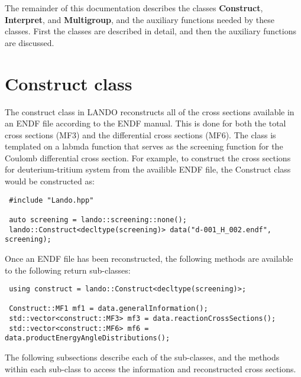 \documentclass[../main.tex]{subfiles}
\begin{document}
The remainder of this documentation describes the classes \textbf{Construct}, \textbf{Interpret}, and \textbf{Multigroup}, and the auxiliary functions needed by these classes. First the classes are described in detail, and then the auxiliary functions are discussed.

\section{Construct class}
The construct class in LANDO reconstructs all of the cross sections available in an ENDF file according to the ENDF manual. This is done for both the total cross sections (MF3) and the differential cross sections (MF6). The class is templated on a labmda function that serves as the screening function for the Coulomb differential cross section. For example, to construct the cross sections for deuterium-tritium system from the availible ENDF file, the Construct class would be constructed as:

\begin{lstlisting}
 #include "Lando.hpp"

 auto screening = lando::screening::none();
 lando::Construct<decltype(screening)> data("d-001_H_002.endf", screening);
\end{lstlisting}

Once an ENDF file has been reconstructed, the following methods are available to the following return sub-classes:

\begin{lstlisting}
 using construct = lando::Construct<decltype(screening)>;
  
 Construct::MF1 mf1 = data.generalInformation();
 std::vector<construct::MF3> mf3 = data.reactionCrossSections();
 std::vector<construct::MF6> mf6 = data.productEnergyAngleDistributions();
\end{lstlisting}

The following subsections describe each of the sub-classes, and the methods within each sub-class to access the information and reconstructed cross sections.
\end{document}
